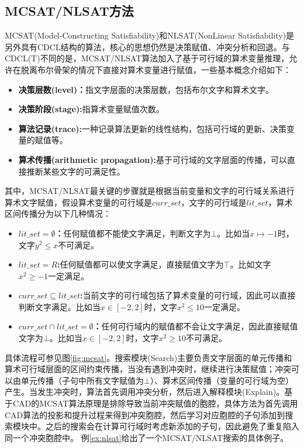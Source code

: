 \subsection{MCSAT/NLSAT方法}
MCSAT(Model-Constructing Satisfiability)和NLSAT(NonLinear Satisfiability)是另外具有CDCL结构的算法，核心的思想仍然是决策赋值、冲突分析和回退。与CDCL(T)不同的是，MCSAT/NLSAT算法加入了基于可行域的算术变量推理，允许在脱离布尔骨架的情况下直接对算术变量进行赋值，一些基本概念介绍如下：
\begin{itemize}
    \item \textbf{决策层数(level)：}指文字层面的决策层数，包括布尔文字和算术文字。
    \item \textbf{决策阶段(stage):}指算术变量赋值次数。
    \item \textbf{算法记录(trace):}一种记录算法更新的线性结构，包括可行域的更新、决策变量的赋值等。
    \item \textbf{算术传播(arithmetic propagation):}基于可行域的文字层面的传播，可以直接推断某些文字的可满足性。
\end{itemize}
其中，MCSAT/NLSAT最关键的步骤就是根据当前变量和文字的可行域关系进行算术文字赋值，假设算术变量的可行域是$curr\_set$，文字的可行域是$lit\_set$，算术区间传播分为以下几种情况：
\begin{itemize}
    \item \textbf{$lit\_set = \emptyset$：}任何赋值都不能使文字满足，判断文字为$\bot$。比如当$x \mapsto -1$时，文字$y^2 \leq x$不可满足。
    \item \textbf{$lit\_set = R$:}任何赋值都可以使文字满足，直接赋值文字为$\top$。比如文字$x^2 \geq -1$一定满足。
    \item \textbf{$curr\_set \subseteq lit\_set$:}当前文字的可行域包括了算术变量的可行域，因此可以直接判断文字满足。比如当$x \in [-2, 2]$时，文字$x^2 \leq 10$一定满足。
    \item \textbf{$curr\_set \cap lit\_set = \emptyset$：}任何可行域内的赋值都不会让文字满足，因此直接赋值文字为$\bot$。比如当$x \in [-2, 2]$时，文字$x^2 \geq 10$不可满足。
\end{itemize}

具体流程可参见图\ref{fig:mcsat}。搜索模块(Search)主要负责文字层面的单元传播和算术可行域层面的区间约束传播，当没有遇到冲突时，继续进行决策赋值；冲突可以由单元传播（子句中所有文字赋值为$\bot$）、算术区间传播（变量的可行域为空）产生。当发生冲突时，算法首先调用冲突分析，然后进入解释模块(Explain)。基于CAD的MCSAT算法原理是排除导致当前冲突赋值的胞腔，具体方法为首先调用CAD算法的投影和提升过程来得到冲突胞腔，然后学习对应胞腔的子句添加到搜索模块中。之后的搜索会在计算可行域时考虑新添加的子句，因此避免了重复陷入同一个冲突胞腔中。
例\ref{ex:nlsat}给出了一个MCSAT/NLSAT搜索的具体例子。

